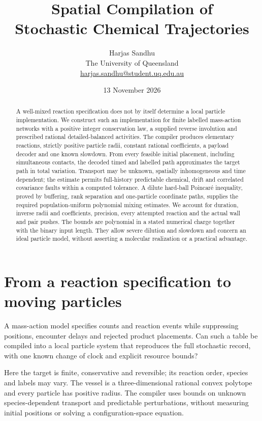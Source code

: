 \documentclass[11pt]{article}
\title{Spatial Compilation of\\Stochastic Chemical Trajectories}
\author{Harjas Sandhu\\[3pt]\small The University of Queensland\\
\small\href{mailto:harjas.sandhu@student.uq.edu.au}{harjas.sandhu@student.uq.edu.au}}
\date{13 November 2026}
\numberwithin{equation}{section}
\theoremstyle{definition}
\theoremstyle{remark}\newtheorem{remark}[theorem]{Remark}
\begin{document}
\maketitle
\begin{abstract}
A well-mixed reaction specification does not by itself determine a local
particle implementation. We construct such an implementation for finite
labelled mass-action networks with a positive integer conservation law,
a supplied reverse involution and prescribed rational detailed-balanced
activities. The compiler produces elementary reactions, strictly positive
particle radii, constant rational coefficients, a payload decoder and one
known slowdown. From every feasible initial placement, including simultaneous
contacts, the decoded timed and labelled path approximates the target path
in total variation. Transport may be unknown, spatially inhomogeneous and
time dependent; the estimate permits full-history predictable chemical,
drift and correlated covariance faults within a computed tolerance. A dilute
hard-ball Poincar\'e inequality, proved by buffering, rank separation and
one-particle coordinate paths, supplies the required population-uniform
polynomial mixing estimates. We account for duration, inverse radii and
coefficients, precision, every attempted reaction and the actual wall and
pair pushes. The bounds are polynomial in a stated numerical charge together
with the binary input length. They allow severe dilution and slowdown and
concern an ideal particle model, without asserting a molecular realization
or a practical advantage.
\end{abstract}
\makeatletter
{\small\setcounter{tocdepth}{1}
\renewcommand*\l@section[2]{\@dottedtocline{1}{0pt}{1.8em}{#1}{#2}}
\tableofcontents}
\makeatother
\clearpage

\section{From a reaction specification to moving particles}
\label{sec:intro}

A mass-action model specifies counts and reaction events while suppressing
positions, encounter delays and rejected product placements. Can such a table
be compiled into a local particle system that reproduces the full stochastic
record, with one known change of clock and explicit resource bounds?

Here the target is finite, conservative and reversible; its reaction order,
species and labels may vary. The vessel is a three-dimensional rational
convex polytope and every particle has positive radius. The compiler uses
bounds on unknown species-dependent transport and predictable perturbations,
without measuring initial positions or solving a configuration-space equation.
\end{document}

